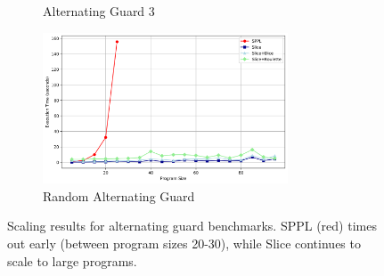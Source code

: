 \begin{figure}[!t]
\begin{subfigure}{0.3\textwidth}
\caption{Alternating Guard 3}
\label{fig:alt-benchmarks-c}
\end{subfigure}
\hfill
\begin{subfigure}{0.3\textwidth}
\includegraphics[width=0.8\textwidth]{../images/scaling/build_random_alternating_guard_slice.png}
\caption{Random Alternating Guard}
\label{fig:alt-benchmarks-d}
\end{subfigure}
\caption{Scaling results for alternating guard benchmarks. SPPL (red) times out early (between program sizes 20-30), while Slice continues to scale to large programs.}
\label{fig:alt-benchmarks}
\end{figure}